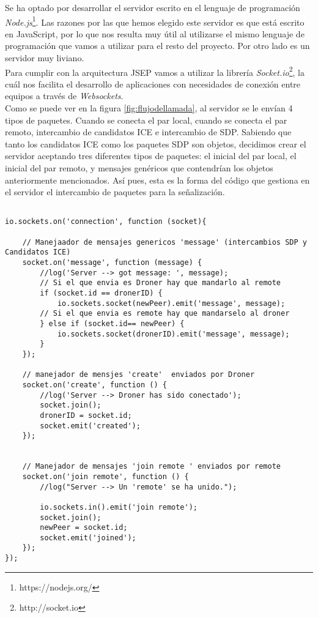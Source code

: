 Se ha optado por desarrollar el servidor escrito en el lenguaje de programación \emph{Node.js}\footnote{https://nodejs.org/}. Las razones por las que hemos elegido este servidor es que está escrito en JavaScript, por lo que nos resulta muy útil al utilizarse el mismo lenguaje de programación que vamos a utilizar para el resto del proyecto. Por otro lado es un servidor muy liviano.\\

Para cumplir con la arquitectura JSEP vamos a utilizar la librería \emph{Socket.io}\footnote{http://socket.io}, la cuál nos facilita el desarrollo de aplicaciones con necesidades de conexión entre equipos a través de \emph{Websockets}.\\

Como se puede ver en la figura \ref{fig:flujodellamada}, al servidor se le envían 4 tipos de paquetes. Cuando se conecta el par local, cuando se conecta el par remoto, intercambio de candidatos ICE e intercambio de SDP. Sabiendo que tanto los candidatos ICE como los paquetes SDP son objetos, decidimos crear el servidor aceptando tres diferentes tipos de paquetes: el inicial del par local, el inicial del par remoto, y mensajes genéricos que contendrían los objetos anteriormente mencionados. Así pues, esta es la forma del código que gestiona en el servidor el intercambio de paquetes para la señalización.\\

\begin{lstlisting}[caption=Nucleo servidor de señalización]

io.sockets.on('connection', function (socket){

	// Manejaador de mensajes genericos 'message' (intercambios SDP y Candidatos ICE)
	socket.on('message', function (message) {
		//log('Server --> got message: ', message);
		// Si el que envia es Droner hay que mandarlo al remote
		if (socket.id == dronerID) {
			io.sockets.socket(newPeer).emit('message', message);
		// Si el que envia es remote hay que mandarselo al droner
		} else if (socket.id== newPeer) {
			io.sockets.socket(dronerID).emit('message', message);
		} 
	});

	// manejador de mensjes 'create'  enviados por Droner
	socket.on('create', function () {
		//log('Server --> Droner has sido conectado');
		socket.join();
		dronerID = socket.id;
		socket.emit('created');
	});
	

	// Manejador de mensajes 'join remote ' enviados por remote
	socket.on('join remote', function () {
		//log("Server --> Un 'remote' se ha unido.");
		
		io.sockets.in().emit('join remote');
		socket.join();
		newPeer = socket.id;
		socket.emit('joined');
	});
});
\end{lstlisting}

